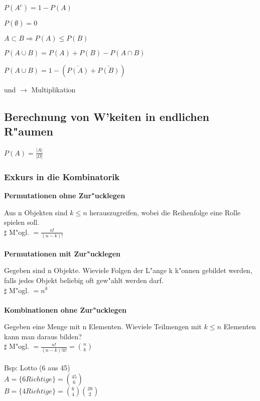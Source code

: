 \documentclass[10pt, a4paper, twocolumn]{scrartcl}
\begin{document}
\begin{description}
 \item $P(A^c)=1-P(A)$
 \item $P(\emptyset)=0$
 \item $A \subset B \Rightarrow P(A)\leq P(B)$
 \item $P(A \cup B)=P(A)+P(B)-P(A \cap B)$
 \item $P(A\cup B)=1-(\bar{P(A)}+\bar{P(B)})$
 \item und $\rightarrow$ Multiplikation
\end{description}


\subsection{Berechnung von W'keiten in endlichen R"aumen}

$P(A)=\frac{|A|}{|\Omega|}$ 

\subsubsection{Exkurs in die Kombinatorik}

\textbf{Permutationen ohne Zur"ucklegen}

Aus n Objekten sind $k \leq n$ herauszugreifen, wobei die Reihenfolge eine Rolle spielen soll.\\

$\sharp$ M"ogl. $=\frac{n!}{(n-k)!}$\\\\

\textbf{Permutationen mit Zur"ucklegen}

Gegeben sind n Objekte. Wieviele Folgen der L"ange k k"onnen gebildet werden, falls jedes Objekt beliebig oft gew"ahlt werden darf.\\

$\sharp$ M"ogl. $=n^k$\\\\

\textbf{Kombinationen ohne Zur"ucklegen}

Gegeben eine Menge mit n Elementen. Wieviele Teilmengen mit $k\leq n$ Elementen kann man daraus bilden?\\

$\sharp$ M"ogl. $=\frac{n!}{(n-k)!k!}=\binom{n}{k}$\\\\

Bsp: Lotto (6 aus 45)\\
$A=\{6 Richtige\}=\binom{45}{6}$\\
$B=\{4 Richtige\}=\binom{6}{4}\binom{39}{2}$
\end{document}
